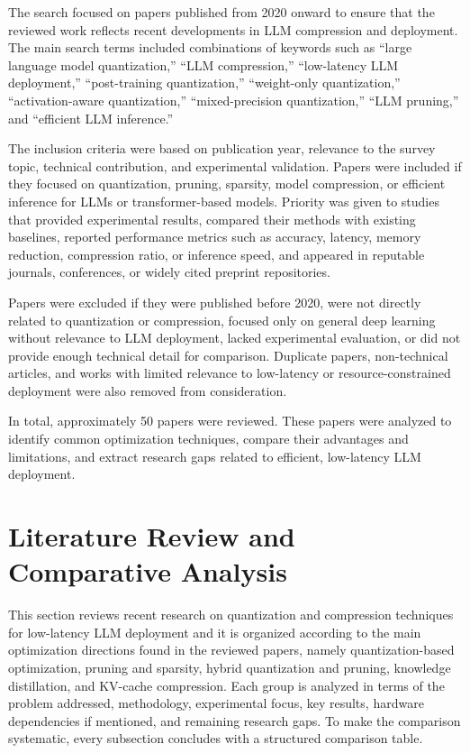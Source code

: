 \documentclass[
11pt, %
english, %
singlespacing, %
headsepline, %
]{MastersDoctoralThesis} %
\begin{document}
The search focused on papers published from 2020 onward to ensure that the reviewed work reflects recent developments in LLM compression and deployment. The main search terms included combinations of keywords such as ``large language model quantization,'' ``LLM compression,'' ``low-latency LLM deployment,'' ``post-training quantization,'' ``weight-only quantization,'' ``activation-aware quantization,'' ``mixed-precision quantization,'' ``LLM pruning,'' and ``efficient LLM inference.''

The inclusion criteria were based on publication year, relevance to the survey topic, technical contribution, and experimental validation. Papers were included if they focused on quantization, pruning, sparsity, model compression, or efficient inference for LLMs or transformer-based models. Priority was given to studies that provided experimental results, compared their methods with existing baselines, reported performance metrics such as accuracy, latency, memory reduction, compression ratio, or inference speed, and appeared in reputable journals, conferences, or widely cited preprint repositories.

Papers were excluded if they were published before 2020, were not directly related to quantization or compression, focused only on general deep learning without relevance to LLM deployment, lacked experimental evaluation, or did not provide enough technical detail for comparison. Duplicate papers, non-technical articles, and works with limited relevance to low-latency or resource-constrained deployment were also removed from consideration.

In total, approximately 50 papers were reviewed. These papers were analyzed to identify common optimization techniques, compare their advantages and limitations, and extract research gaps related to efficient, low-latency LLM deployment.

\section{Literature Review and Comparative Analysis}
\label{sec:lr-review}

This section reviews recent research on quantization and compression techniques for low-latency LLM deployment and it is organized according to the main optimization directions found in the reviewed papers, namely quantization-based optimization, pruning and sparsity, hybrid quantization and pruning, knowledge distillation, and KV-cache compression. Each group is analyzed in terms of the problem addressed, methodology, experimental focus, key results, hardware dependencies if mentioned, and remaining research gaps. To make the comparison systematic, every subsection concludes with a structured comparison table.
\end{document}
